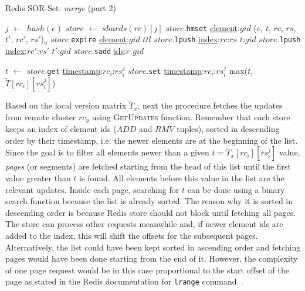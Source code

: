 \begin{algorithm}[t]
\small{
	\caption{Redis SOR-Set: \textit{merge} (part 2)}

 	\begin{algorithmic}[1]

 	      \State $j$ $\gets$ $hash(e)$
 	      \State $store$ $\gets$ $shards(rc)[j]$
 	      \State $store$.\texttt{hmset} \underline{element}:$gid$ ($e$, $t$, $rc$, $rs$, $t'$, $rc'$, $rs'$)$_{u}$
 	      \State $store$.\texttt{expire} \underline{element}:$gid$ $ttl$
 	        \State $store$.\texttt{lpush} \underline{index}:$rc$:$rs$ $t$:$gid$
 	      \Else
 	        \State $store$.\texttt{lpush} \underline{index}:$rc'$:$rs'$ $t'$:$gid$
 	      \EndIf
 	      \State $store$.\texttt{sadd} \underline{ids}:$e$ $gid$
 	    \EndFor
 	  \EndProcedure

              \State $t$ $\gets$ $store$.\texttt{get} \underline{timestamp}:$rc_{i}$:$rs_{i}^{j}$
              \State $store$.\texttt{set} \underline{timestamp}:$rc_{i}$:$rs_{i}^{j}$ max($t$, $\tilde{T}[rc_{i}][rs_{i}^{j}]$)
            \EndFor
          \EndFor
        \EndFor
      \EndProcedure
	\end{algorithmic}
 }
\end{algorithm}

Based on the local version matrix $\tilde{T}_{x}$, next the procedure fetches
the updates from remote cluster $rc_{y}$ using {\small\textsc{GetUpdates}}
function. Remember that each store keeps an index of element ids ($ADD$ and
$RMV$ tuples), sorted in descending order by their timestamp, i.e. the newer
elements are at the beginning of the list. Since the goal is to filter all
elements newer than a given $t = \tilde{T}_{x}[rc_{i}][rs_{i}^{j}]$ value, 
\textit{pages} (or segments) are fetched starting from the head of this list
until the first value greater than $t$ is found. All elements before this value
in the list are the relevant updates. Inside each page, searching for $t$ can be
done using a binary search function because the list is already sorted. The
reason why it is sorted in descending order is because Redis store should not
block until fetching all pages. The store can process other requests meanwhile
and, if newer element ids are added to the index, this will shift the offsets
for the subsequent pages. Alternatively, the list could have been kept sorted in
ascending order and fetching pages would have been done starting from the end of
it. However, the complexity of one page request would be in this case
proportional to the start offset of the page as stated in the Redis
documentation for \texttt{lrange} command~\cite{redis}.


